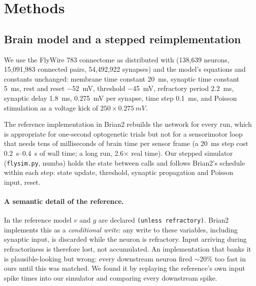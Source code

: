 \documentclass[10pt,a4paper]{article}
\begin{document}
\section{Methods}

\subsection{Brain model and a stepped reimplementation}

We use the FlyWire 783 connectome as distributed with \cite{shiu2024} (138{,}639 neurons, 15{,}091{,}983
connected pairs, 54{,}492{,}922 synapses) and the model's equations and constants unchanged: membrane
time constant \SI{20}{ms}, synaptic time constant \SI{5}{ms}, rest and reset \SI{-52}{mV}, threshold
\SI{-45}{mV}, refractory period \SI{2.2}{ms}, synaptic delay \SI{1.8}{ms}, \SI{0.275}{mV} per synapse,
time step \SI{0.1}{ms}, and Poisson stimulation as a voltage kick of $250 \times \SI{0.275}{mV}$.

The reference implementation in Brian2 \cite{stimberg2019} rebuilds the network for every run, which is
appropriate for one-second optogenetic trials but not for a sensorimotor loop that needs tens of
milliseconds of brain time per sensor frame (a \SI{20}{ms} step cost \SIrange{0.2}{0.4}{s} of wall time;
a long run, 2.6$\times$ real time). Our stepped simulator (\texttt{flysim.py}, numba) holds the state
between calls and follows Brian2's schedule within each step: state update, threshold, synaptic
propagation and Poisson input, reset.

\paragraph{A semantic detail of the reference.} In the reference model $v$ and $g$ are declared
\texttt{(unless refractory)}. Brian2 implements this as a \emph{conditional write}: any write to these
variables, including synaptic input, is discarded while the neuron is refractory. Input arriving during
refractoriness is therefore lost, not accumulated. An implementation that banks it is plausible-looking
but wrong: every downstream neuron fired $\sim$20\% too fast in ours until this was matched. We found it by
replaying the reference's own input spike times into our simulator and comparing every downstream spike.
\end{document}
